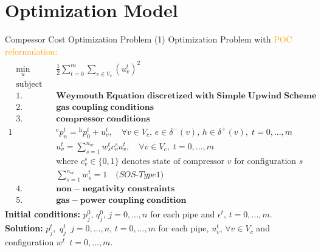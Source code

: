 \documentclass[8pt]{beamer}
\newcommand\Fontli{\fontsize{7}{7.2}\selectfont}
\begin{document}
\section{Optimization Model}
\begin{frame}{Compessor Cost Optimization Problem (1)}
\Fontli
Optimization Problem with \textcolor{orange}{POC reformulation:}
\begin{alignat}{1}
\begin{split}
\min_{u}\quad & \frac{1}{2}  \sum_{t=0}^m \sum_{v \in V_c}^{} (u_v^t)^2 \\
 \text{subject to: }  & \\
\text{1.    } & \mathbf{Weymouth \; Equation \; discretized \; with \; Simple \; Upwind \; Scheme} \\
\text{2.    } &  \mathbf{gas \; coupling \; conditions} \\
\text{3.   } &  \mathbf{compressor \; conditions}  \\
& {}^\text{e}p_n^t = {}^\text{h}p_0^t +  u_v^t, \quad \forall v \in V_c,  \, e \in \delta^-(v),  \, h \in \delta^+(v), \; t = 0,...,m\\
& u_{v}^t = \sum_{s=1}^{n_{oc}} w_s^t c_{v}^s u_v^t, \quad \forall v \in V_c, \; t = 0,...,m \\
& \text{where } c_{v}^s \in \{0,1\} \text{ denotes state of compressor $v$ for configuration $s$} \\
& \sum_{s=1}^{n_{oc}} w_s^t = 1 \quad \textit{(SOS-Type1)} \\
 \text{4.    } & \mathbf{non-negativity \; constraints}  \\
 \text{5.    } &  \mathbf{gas-power \; coupling \; condition} 
\end{split}
\end{alignat}
\textbf{Initial conditions:} $p_j^0$,  $q_j^0$, $j=0,...,n$ for each pipe and $\epsilon^t$,  $t = 0,...,m$. \newline
\textbf{Solution:} $p_j^t$,  $\, q_j^t$ $\, j=0,...,n$,  $t=0,...,m$  \textnormal{for each pipe}, $u_{v}^t$, $\forall v \in V_c$ and configuration $w^t$ $\, t=0,...,m$.  \newline
\end{frame}
\end{document}
